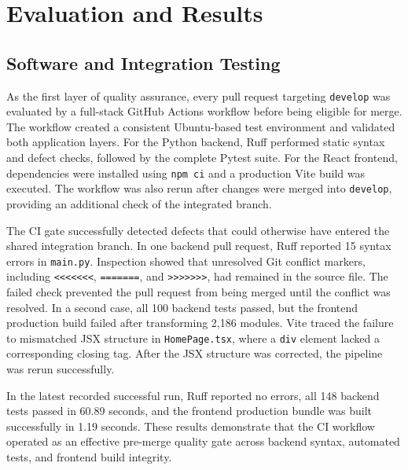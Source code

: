 ﻿\documentclass[conference,a4paper]{IEEEtran}
\newif\ifshowguidance
\newcommand{\guidance}[1]{%
  \ifshowguidance
    \par\smallskip
    \noindent\fcolorbox{gray}{gray!8}{%
      \parbox{\dimexpr\columnwidth-2\fboxsep-2\fboxrule\relax}{%
        \footnotesize\color{gray!75!black}\textbf{Draft guidance:} #1}}
    \par\smallskip
  \fi
}
\begin{document}
\section{Evaluation and Results}
\label{sec:evaluation}
\guidance{Target: 1.40--1.60 pages. Report methods and measurable results,
not only completed features. Include unit/component and end-to-end testing,
ML train/test results, UI/user evaluation and feedback, design-decision
evidence, deployment observations, and limitations. A compact results table
can use space more efficiently than multiple screenshots.}

\subsection{Software and Integration Testing}

As the first layer of quality assurance, every pull request targeting
\texttt{develop} was evaluated by a full-stack GitHub Actions workflow before
being eligible for merge. The workflow created a consistent Ubuntu-based test
environment and validated both application layers. For the Python backend,
Ruff performed static syntax and defect checks, followed by the complete
Pytest suite. For the React frontend, dependencies were installed using
\texttt{npm ci} and a production Vite build was executed. The workflow was
also rerun after changes were merged into \texttt{develop}, providing an
additional check of the integrated branch.



The CI gate successfully detected defects that could otherwise have entered
the shared integration branch. In one backend pull request, Ruff reported 15
syntax errors in \texttt{main.py}. Inspection showed that unresolved Git
conflict markers, including \texttt{<<<<<<<}, \texttt{=======}, and
\texttt{>>>>>>>}, had remained in the source file. The failed check prevented
the pull request from being merged until the conflict was resolved. In a
second case, all 100 backend tests passed, but the frontend production build
failed after transforming 2,186 modules. Vite traced the failure to mismatched
JSX structure in \texttt{HomePage.tsx}, where a \texttt{div} element lacked a
corresponding closing tag. After the JSX structure was corrected, the pipeline
was rerun successfully.



In the latest recorded successful run, Ruff reported no errors, all 148
backend tests passed in 60.89 seconds, and the frontend production bundle was
built successfully in 1.19 seconds. These results demonstrate that the CI
workflow operated as an effective pre-merge quality gate across backend
syntax, automated tests, and frontend build integrity.
\end{document}
